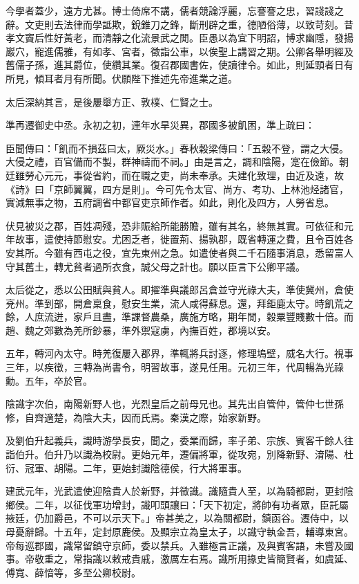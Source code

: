 \begin{pinyinscope}
今學者蓋少，遠方尤甚。博士倚席不講，儒者競論浮麗，忘謇謇之忠，習諓諓之辭。文吏則去法律而學詆欺，銳錐刀之鋒，斷刑辟之重，德陋俗薄，以致苛刻。昔孝文竇后性好黃老，而清靜之化流景武之閒。臣愚以為宜下明詔，博求幽隱，發揚巖穴，寵進儒雅，有如孝、宮者，徵詣公車，以俟聖上講習之期。公卿各舉明經及舊儒子孫，進其爵位，使纘其業。復召郡國書佐，使讀律令。如此，則延頸者日有所見，傾耳者月有所聞。伏願陛下推述先帝進業之道。

太后深納其言，是後屢舉方正、敦樸、仁賢之士。

準再遷御史中丞。永初之初，連年水旱災異，郡國多被飢困，準上疏曰：

臣聞傳曰：「飢而不損茲曰太，厥災水。」春秋穀梁傳曰：「五穀不登，謂之大侵。大侵之禮，百官備而不製，群神禱而不祠。」由是言之，調和陰陽，寔在儉節。朝廷雖勞心元元，事從省約，而在職之吏，尚未奉承。夫建化致理，由近及遠，故《詩》曰「京師翼翼，四方是則」。今可先令太官、尚方、考功、上林池烃諸官，實減無事之物，五府調省中都官吏京師作者。如此，則化及四方，人勞省息。

伏見被災之郡，百姓凋殘，恐非賑給所能勝贍，雖有其名，終無其實。可依征和元年故事，遣使持節慰安。尤困乏者，徙置荊、揚孰郡，既省轉運之費，且令百姓各安其所。今雖有西屯之役，宜先東州之急。如遣使者與二千石隨事消息，悉留富人守其舊土，轉尤貧者過所衣食，誠父母之計也。願以臣言下公卿平議。

太后從之，悉以公田賦與貧人。即擢準與議郎呂倉並守光祿大夫，準使冀州，倉使兗州。準到部，開倉稟食，慰安生業，流人咸得蘇息。還，拜鉅鹿太守。時飢荒之餘，人庶流迸，家戶且盡，準課督農桑，廣施方略，期年閒，穀粟豐賤數十倍。而趙、魏之郊數為羌所鈔暴，準外禦寇虜，內撫百姓，郡境以安。

五年，轉河內太守。時羌復屢入郡界，準輒將兵討逐，修理塢壁，威名大行。視事三年，以疾徵，三轉為尚書令，明習故事，遂見任用。元初三年，代周暢為光祿勳。五年，卒於官。

陰識字次伯，南陽新野人也，光烈皇后之前母兄也。其先出自管仲，管仲七世孫修，自齊適楚，為陰大夫，因而氏焉。秦漢之際，始家新野。

及劉伯升起義兵，識時游學長安，聞之，委業而歸，率子弟、宗族、賓客千餘人往詣伯升。伯升乃以識為校尉。更始元年，遷偏將軍，從攻宛，別降新野、淯陽、杜衍、冠軍、胡陽。二年，更始封識陰德侯，行大將軍事。

建武元年，光武遣使迎陰貴人於新野，并徵識。識隨貴人至，以為騎都尉，更封陰鄉侯。二年，以征伐軍功增封，識叩頭讓曰：「天下初定，將帥有功者眾，臣託屬掖廷，仍加爵邑，不可以示天下。」帝甚美之，以為關都尉，鎮函谷。遷侍中，以母憂辭歸。十五年，定封原鹿侯。及顯宗立為皇太子，以識守執金吾，輔導東宮。帝每巡郡國，識常留鎮守京師，委以禁兵。入雖極言正議，及與賓客語，未嘗及國事。帝敬重之，常指識以敕戒貴戚，激厲左右焉。識所用掾史皆簡賢者，如虞延、傅寬、薛愔等，多至公卿校尉。


\end{pinyinscope}
